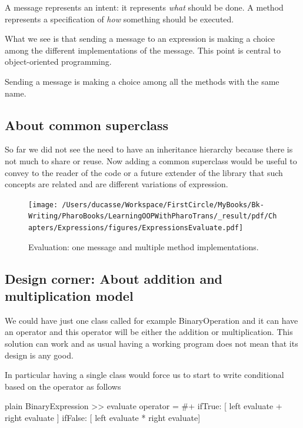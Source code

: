 \documentclass[10pt,twoside,english]{_support/latex/sbabook/sbabook}
\begin{document}
\begin{important}
A message represents an intent: it represents \textit{what} should be done. A method represents a specification of \textit{how} something should be executed.
\end{important}

What we see is that sending a message  to an expression is making a choice among the different implementations of the message. This point is central to object-oriented programming. 

\begin{important}
Sending a message is making a choice among all the methods with the same name. 
\end{important}
\subsection{About common superclass}
So far we did not see the need to have an inheritance hierarchy because there is not much to share or reuse. Now adding a common superclass would be useful to convey to the reader of the code or a future extender of the library that such concepts are related and are different variations of expression. 


\begin{figure}

\begin{center}
\texttt{[image: /Users/ducasse/Workspace/FirstCircle/MyBooks/Bk-Writing/PharoBooks/LearningOOPWithPharoTrans/\_result/pdf/Chapters/Expressions/figures/ExpressionsEvaluate.pdf]}\caption{Evaluation: one message and multiple method implementations.\label{figExpressionEvaluate}}\end{center}
\end{figure}

\subsection{Design corner: About addition and multiplication model }
We could have just one class called for example BinaryOperation and it can have an operator and this operator will be either 
the addition or multiplication. This solution can work and as usual having a working program does not mean that its design is any good. 

In particular having a single class would force us to start to write conditional based on the operator as follows

\begin{displaycode}{plain}
BinaryExpression >> evaluate
	operator = #+ 
		ifTrue: [ left evaluate + right evaluate ] 
		ifFalse: [ left evaluate * right evaluate]
\end{displaycode}
\end{document}
